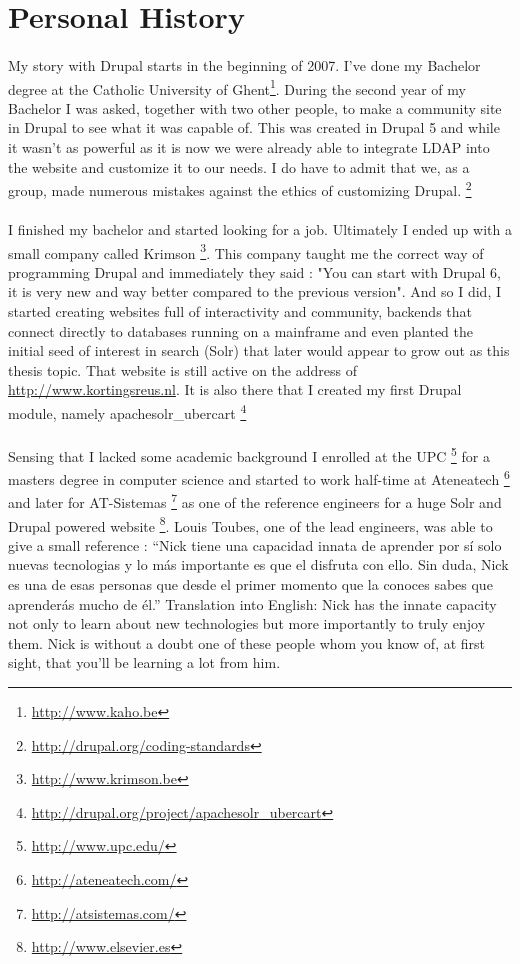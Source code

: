 \section{Personal History}
\paragraph{}
My story with Drupal starts in the beginning of 2007. I've done my Bachelor degree at the Catholic University of Ghent\footnote{\url{http://www.kaho.be}}. During the second year of my Bachelor I was asked, together with two other people, to make a community site in Drupal to see what it was capable of. This was created in Drupal 5 and while it wasn't as powerful as it is now we were already able to integrate LDAP into the website and customize it to our needs. I do have to admit that we, as a group, made numerous mistakes against the ethics of customizing Drupal. \footnote{\url{http://drupal.org/coding-standards}} 

\paragraph{}
I finished my bachelor and started looking for a job. Ultimately I ended up with a small company called Krimson \footnote{\url{http://www.krimson.be}}. This company taught me the correct way of programming Drupal and immediately they said : "You can start with Drupal 6, it is very new and way better compared to the previous version". And so I did, I started creating websites full of interactivity and community, backends that connect directly to databases running on a mainframe and even planted the initial seed of interest in search (Solr) that later would appear to grow out as this thesis topic. That website is still active on the address of \url{http://www.kortingsreus.nl}. It is also there that I created my first Drupal module, namely apachesolr\_ubercart \footnote{\url{http://drupal.org/project/apachesolr_ubercart}}

\paragraph{}
Sensing that I lacked some academic background I enrolled at the UPC \footnote{\url{http://www.upc.edu/}} for a masters degree in computer science and started to work half-time at Ateneatech \footnote{\url{http://ateneatech.com/}} and later for AT-Sistemas \footnote{\url{http://atsistemas.com/}} as one of the reference engineers for a huge Solr and Drupal powered website \footnote{\url{http://www.elsevier.es}}. 
Louis Toubes, one of the lead engineers, was able to give a small reference : “Nick tiene una capacidad innata de aprender por sí solo nuevas tecnologias y lo más importante es que el disfruta con ello. Sin duda, Nick es una de esas personas que desde el primer momento que la conoces sabes que aprenderás mucho de él.”
Translation into English: Nick has the innate capacity not only to learn about new technologies but more importantly to truly enjoy them. Nick is without a doubt one of these people whom you know of, at first sight, that you'll be learning a lot from him.


